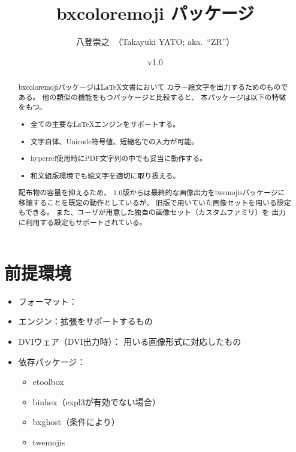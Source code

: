 \documentclass[a4paper]{ltjsarticle}
\newcommand{\PkgVersion}{1.0}
\newcommand{\PkgDate}{2024/11/11}
\newcommand{\Pkg}[1]{\textsf{#1}}
\newcommand{\Means}{：\quad}
\newcommand{\／}{\mbox{}／\mbox{}}
\begin{document}
\title{\Pkg{bxcoloremoji} パッケージ}
\author{八登崇之\ （Takayuki YATO; aka.~“ZR”）}
\date{v\PkgVersion\quad[\PkgDate]}
\maketitle

\begin{abstract}
\Pkg{bxcoloremoji}パッケージは{\LaTeX}文書において
カラー絵文字を出力するためのものである。
他の類似の機能をもつパッケージと比較すると、
本パッケージは以下の特徴をもつ。
\begin{itemize}
\item 全ての主要な{\LaTeX}エンジンをサポートする。
\item 文字自体、Unicode符号値、短縮名での入力が可能。
\item \Pkg{hyperref}使用時にPDF文字列の中でも妥当に動作する。
\item 和文組版環境でも絵文字を適切に取り扱える。
\end{itemize}

配布物の容量を抑えるため、
1.0版からは最終的な画像出力を\Pkg{twemojis}パッケージに
移譲することを既定の動作としているが、
旧版で用いていた画像セットを用いる設定もできる。
また、ユーザが用意した独自の画像セット（カスタムファミリ）を
出力に利用する設定もサポートされている。
\end{abstract}

\tableofcontents


\section{前提環境}
\label{sec:Prerequisites}

\begin{itemize}
\item フォーマット\Means {\LaTeX}
\item エンジン\Means {\eTeX}拡張をサポートするもの
\item DVIウェア（DVI出力時）\Means
  用いる画像形式に対応したもの
\item 依存パッケージ\Means
  \begin{itemize}
  \item \Pkg{etoolbox}
  \item \Pkg{binhex}（expl3が有効でない場合）
  \item \Pkg{bxghost}（条件により）
  \item \Pkg{twemojis}
  \end{itemize}
\end{itemize}
\end{document}
